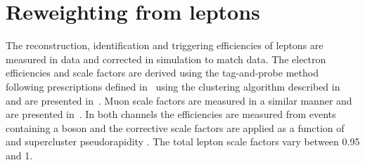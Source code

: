 \section{Reweighting from leptons} %
\label{sub:reweighting_from_leptons}

The reconstruction, identification and triggering efficiencies of leptons are measured in data and corrected in simulation to match data.
The electron efficiencies and scale factors are derived using the tag-and-probe method following prescriptions defined in~\cite{Event:eSFMethod} using the clustering algorithm described in~\cite{Event:PFlow} and are presented in~\cite{Event:ElectronSF}.
Muon scale factors are measured in a similar manner and are presented in~\cite{Event:MuonSF,Event:MuonTrigSF}.
In both channels the efficiencies are measured from events containing a \Zboson{} boson and the corrective scale factors are applied as a function of \pt{} and supercluster pseudorapidity \sceta{}.
The total lepton scale factors vary between 0.95 and 1.

